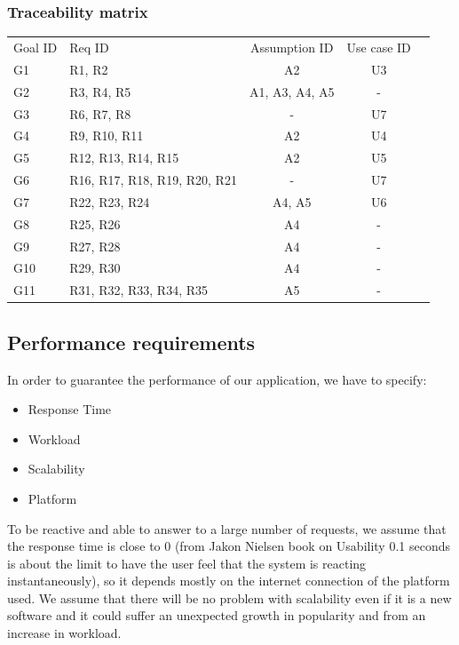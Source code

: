 \documentclass[12pt,titlepage]{article}
\begin{document}
 \subsubsection{Traceability matrix}
\begin{tabular}{llccr}
\rowcolor{red}
Goal ID & Req ID & Assumption ID & Use case ID \\
\rowcolor{lightgray}
 G1 &R1, R2 & A2&  U3 \\
\rowcolor{anti-flashwhite}
G2 & R3, R4, R5 & A1, A3, A4, A5& -\\
\rowcolor{lightgray}
G3 & R6, R7, R8 & - & U7 \\
\rowcolor{anti-flashwhite}
G4 & R9, R10, R11 & A2 & U4 \\
\rowcolor{lightgray}
G5 & R12, R13, R14, R15 & A2& U5 \\
\rowcolor{anti-flashwhite}
G6 & R16, R17, R18, R19, R20, R21 & - &  U7 \\
\rowcolor{lightgray}
G7 & R22, R23, R24 &A4, A5& U6 \\
\rowcolor{anti-flashwhite}
G8 & R25, R26 & A4& - \\
\rowcolor{lightgray}
G9 & R27, R28 & A4& - \\
\rowcolor{anti-flashwhite}
G10 & R29, R30& A4& - \\
\rowcolor{lightgray}
G11 & R31, R32, R33, R34, R35 & A5&- 
\end{tabular}

\subsection{Performance requirements}\label{sec:mod1}
In order to guarantee the performance of our application, we have to specify:
\begin{itemize}
\item Response Time 
\item Workload
\item Scalability
\item Platform
\end{itemize}
To be reactive and able to answer to a large number of requests, we assume that the response time is close to 0 (from Jakon Nielsen book on Usability 0.1 seconds is about the limit to have the user feel that the system is reacting instantaneously), so it depends mostly on the internet connection of the platform used. 
We assume that there will be no problem with scalability even if it is a new software and it could suffer an unexpected growth in popularity and from an increase in workload.
\end{document}
